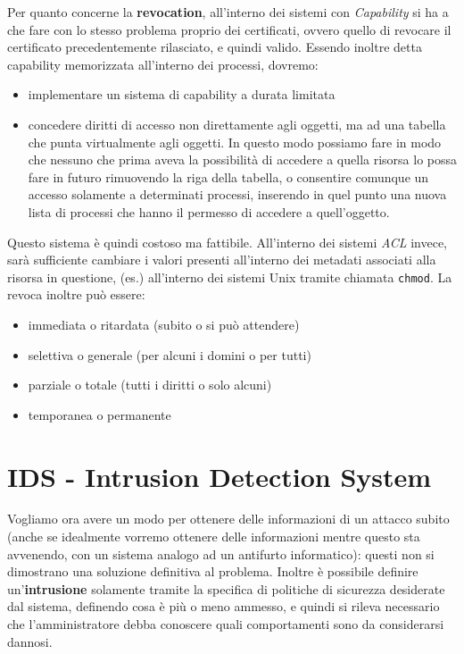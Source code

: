 Per quanto concerne la \textbf{revocation}, all'interno dei sistemi con \textit{Capability}
si ha a che fare con lo stesso problema proprio dei certificati, ovvero quello di 
revocare il certificato precedentemente rilasciato, e quindi valido. Essendo 
inoltre detta capability memorizzata all'interno dei processi, dovremo:
\begin{itemize}
\item implementare un sistema di capability a durata limitata
\item concedere diritti di accesso non direttamente agli oggetti, ma ad una
	tabella che punta virtualmente agli oggetti. In questo modo possiamo
	fare in modo che nessuno che prima aveva la possibilità di accedere
	a quella risorsa lo possa fare in futuro rimuovendo la riga della 
	tabella, o consentire comunque un accesso solamente a determinati
	processi, inserendo in quel punto una nuova lista di processi che
	hanno il permesso di accedere a quell'oggetto.
\end{itemize}
Questo sistema è quindi costoso ma fattibile. All'interno dei sistemi \textit{ACL}
invece, sarà sufficiente cambiare i valori presenti all'interno dei metadati
associati alla risorsa in questione, (es.) all'interno dei sistemi Unix tramite
chiamata \texttt{chmod}.
La revoca inoltre può essere:
\begin{itemize}
\item immediata o ritardata (subito o si può attendere)
\item selettiva o generale (per alcuni i domini o per tutti)
\item parziale o totale (tutti i diritti o solo alcuni)
\item temporanea o permanente
\end{itemize}

\section{IDS - Intrusion Detection System}
Vogliamo ora avere un modo per ottenere delle informazioni di un attacco subito
(anche se idealmente vorremo ottenere delle informazioni mentre questo sta 
avvenendo, con un sistema analogo ad un antifurto informatico): questi non si 
dimostrano una soluzione definitiva al problema. Inoltre è possibile definire
un'\textbf{intrusione} solamente tramite la specifica di politiche di sicurezza
desiderate dal sistema, definendo cosa è più o meno ammesso, e quindi si rileva
necessario che l'amministratore debba conoscere quali comportamenti sono da considerarsi
dannosi.

